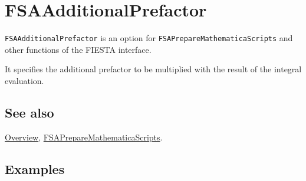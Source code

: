 \documentclass[../FeynHelpersManual.tex]{subfiles}
\begin{document}
\begin{Shaded}
\begin{Highlighting}[]
 
\end{Highlighting}
\end{Shaded}

\hypertarget{fsaadditionalprefactor}{
\section{FSAAdditionalPrefactor}\label{fsaadditionalprefactor}}

\texttt{FSAAdditionalPrefactor} is an option for
\texttt{FSAPrepareMathematicaScripts} and other functions of the FIESTA
interface.

It specifies the additional prefactor to be multiplied with the result
of the integral evaluation.

\subsection{See also}

\hyperlink{toc}{Overview},
\hyperlink{fsapreparemathematicascripts}{FSAPrepareMathematicaScripts}.

\subsection{Examples}
\end{document}
